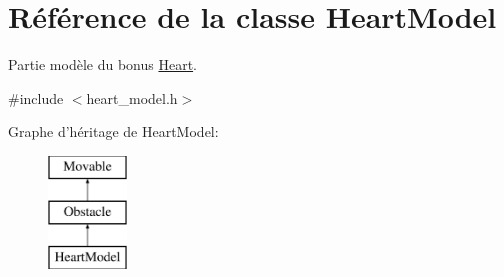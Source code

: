 \hypertarget{class_heart_model}{\section{Référence de la classe Heart\+Model}
\label{class_heart_model}
}


Partie modèle du bonus \hyperlink{class_heart}{Heart}.  




{\ttfamily \#include $<$heart\+\_\+model.\+h$>$}

Graphe d'héritage de Heart\+Model\+:\begin{figure}[H]
\begin{center}
\leavevmode
\includegraphics[height=3.000000cm]{class_heart_model}
\end{center}
\end{figure}
